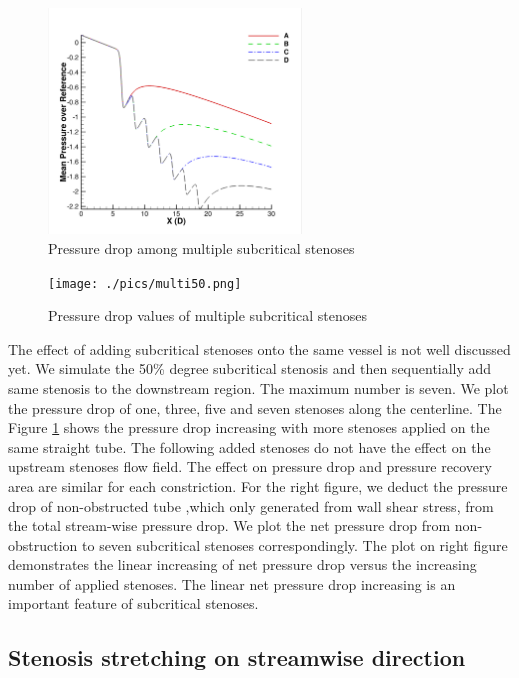 \begin{figure}[H]
	\centering
	\includegraphics[trim= 1mm 0mm 1mm 0mm,clip,width=0.60\textwidth]{./pics/m50.png}
	\caption{Pressure drop among multiple subcritical stenoses}
	\label{fig: Pressure drop among multiple subcritical stenoses}
\end{figure}

\begin{figure}[H]
	\centering
	\texttt{[image: ./pics/multi50.png]}
	\caption{Pressure drop values of multiple subcritical stenoses}
	\label{fig:Pressure drop values of multiple subcritical stenoses}
\end{figure}


The effect of adding subcritical stenoses onto the same vessel is not well discussed yet. 
We simulate the 50\% degree subcritical stenosis and then sequentially add same stenosis to the downstream region. The maximum number is seven. We plot the pressure drop of one, three, five and seven stenoses along the centerline.  
The Figure \ref{fig: Pressure drop among multiple subcritical stenoses} shows the pressure drop increasing with more stenoses applied on the same straight tube.
The following added stenoses do not have the effect on the upstream stenoses flow field. The effect on pressure drop and pressure recovery area are similar for each constriction.
For the right figure, we deduct the pressure drop of non-obstructed tube ,which only generated from wall shear stress, from the total stream-wise pressure drop. 
We plot the net pressure drop from non-obstruction to seven subcritical stenoses correspondingly.
The plot on right figure demonstrates the linear increasing of net pressure drop versus the increasing number of applied stenoses.
The linear net pressure drop increasing is an important feature of subcritical stenoses.

\subsection{Stenosis stretching on streamwise direction}

